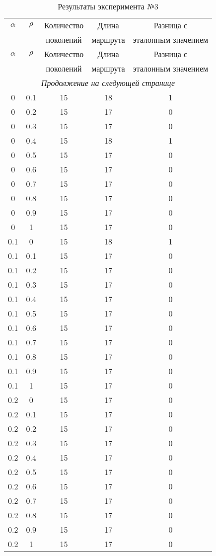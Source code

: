 \begin{longtable}{|c|c|c|c|c|}
	\caption{Результаты эксперимента №3}\label{table_3}\\
	\hline
	
	$\alpha$ & $\rho$ & Количество  & Длина & Разница с  \\
	&& поколений & маршрута & эталонным значением\\
	\hline
	\endfirsthead
	
	\hline
	$\alpha$ & $\rho$ & Количество  & Длина & Разница с  \\
	&& поколений & маршрута & эталонным значением\\
	\hline
	\endhead
	
	\hline
	\multicolumn{5}{c}{\textit{Продолжение на следующей странице}}
	\endfoot
	\hline
	\endlastfoot
	
	0& 0& 15& 18& 1 \\
	0& 0.1& 15& 18& 1 \\
	0& 0.2& 15& 17& 0 \\
	0& 0.3& 15& 17& 0 \\
	0& 0.4& 15& 18& 1 \\
	0& 0.5& 15& 17& 0 \\
	0& 0.6& 15& 17& 0 \\
	0& 0.7& 15& 17& 0 \\
	0& 0.8& 15& 17& 0 \\
	0& 0.9& 15& 17& 0 \\
	0& 1& 15& 17& 0 \\
	\hline
	
	0.1& 0& 15& 18& 1 \\
	0.1& 0.1& 15& 17& 0 \\
	0.1& 0.2& 15& 17& 0 \\
	0.1& 0.3& 15& 17& 0 \\
	0.1& 0.4& 15& 17& 0 \\
	0.1& 0.5& 15& 17& 0 \\
	0.1& 0.6& 15& 17& 0 \\
	0.1& 0.7& 15& 17& 0 \\
	0.1& 0.8& 15& 17& 0 \\
	0.1& 0.9& 15& 17& 0 \\
	0.1& 1& 15& 17& 0 \\
	\hline
	
	0.2& 0& 15& 17& 0 \\
	0.2& 0.1& 15& 17& 0 \\
	0.2& 0.2& 15& 17& 0 \\
	0.2& 0.3& 15& 17& 0 \\
	0.2& 0.4& 15& 17& 0 \\
	0.2& 0.5& 15& 17& 0 \\
	0.2& 0.6& 15& 17& 0 \\
	0.2& 0.7& 15& 17& 0 \\
	0.2& 0.8& 15& 17& 0 \\
	0.2& 0.9& 15& 17& 0 \\
	0.2& 1& 15& 17& 0 \\
	\hline
	

\end{longtable}
